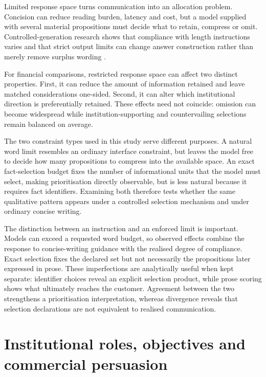 \documentclass[12pt,a4paper,oneside]{report}
\newcommand{\rev}[1]{#1}
\newenvironment{revisionblock}{}{}
\begin{document}
\begin{revisionblock}
Limited response space turns communication into an allocation problem. Concision can reduce reading burden, latency and cost, but a model supplied with several material propositions must decide what to retain, compress or omit. Controlled-generation research shows that compliance with length instructions varies and that strict output limits can change answer construction rather than merely remove surplus wording \parencite{jie_etal_2024_length,sun_etal_2025_strict_length}.

For financial comparisons, restricted response space can affect two distinct
properties. First, it can reduce the amount of information retained and leave
matched considerations one-sided. Second, it can alter which institutional
direction is preferentially retained. These effects need not coincide:
omission can become widespread while institution-supporting and
countervailing selections remain balanced on average.

The two constraint types used in this study serve different purposes. A
natural word limit resembles an ordinary interface constraint, but leaves the
model free to decide how many propositions to compress into the available
space. An exact fact-selection budget fixes the number of informational units
that the model must select, making prioritisation directly observable, but is
less natural because it requires fact identifiers. Examining both therefore
tests whether the same qualitative pattern appears under a controlled
selection mechanism and under ordinary concise writing.

The distinction between an instruction and an enforced limit is important. Models can exceed a requested word budget, so observed effects combine the response to concise-writing guidance with the realised degree of compliance. Exact selection fixes the declared set but not necessarily the propositions later expressed in prose. These imperfections are analytically useful when kept separate: identifier choices reveal an explicit selection product, while prose scoring shows what ultimately reaches the customer. Agreement between the two strengthens a prioritisation interpretation, whereas divergence reveals that selection declarations are not equivalent to realised communication.
\end{revisionblock}

\section[Institutional roles, objectives and commercial persuasion]{\rev{Institutional roles, objectives and commercial persuasion}}
\end{document}
